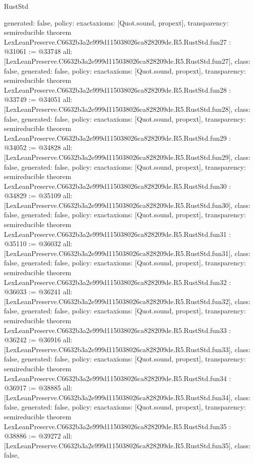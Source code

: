\begin{lexlean}{RustStd}
\begin{coremodule}
{  generated: false,
  policy: exact{axioms: [Quot.sound, propext]},
  transparency: semireducible
}
theorem LexLeanPreserve.C6632b3a2e999d115038026ca828209de.R5.RustStd.fun27 : @31061 := @33748 {
  all: [LexLeanPreserve.C6632b3a2e999d115038026ca828209de.R5.RustStd.fun27],
  class: false,
  generated: false,
  policy: exact{axioms: [Quot.sound, propext]},
  transparency: semireducible
}
theorem LexLeanPreserve.C6632b3a2e999d115038026ca828209de.R5.RustStd.fun28 : @33749 := @34051 {
  all: [LexLeanPreserve.C6632b3a2e999d115038026ca828209de.R5.RustStd.fun28],
  class: false,
  generated: false,
  policy: exact{axioms: [Quot.sound, propext]},
  transparency: semireducible
}
theorem LexLeanPreserve.C6632b3a2e999d115038026ca828209de.R5.RustStd.fun29 : @34052 := @34828 {
  all: [LexLeanPreserve.C6632b3a2e999d115038026ca828209de.R5.RustStd.fun29],
  class: false,
  generated: false,
  policy: exact{axioms: [Quot.sound, propext]},
  transparency: semireducible
}
theorem LexLeanPreserve.C6632b3a2e999d115038026ca828209de.R5.RustStd.fun30 : @34829 := @35109 {
  all: [LexLeanPreserve.C6632b3a2e999d115038026ca828209de.R5.RustStd.fun30],
  class: false,
  generated: false,
  policy: exact{axioms: [Quot.sound, propext]},
  transparency: semireducible
}
theorem LexLeanPreserve.C6632b3a2e999d115038026ca828209de.R5.RustStd.fun31 : @35110 := @36032 {
  all: [LexLeanPreserve.C6632b3a2e999d115038026ca828209de.R5.RustStd.fun31],
  class: false,
  generated: false,
  policy: exact{axioms: [Quot.sound, propext]},
  transparency: semireducible
}
theorem LexLeanPreserve.C6632b3a2e999d115038026ca828209de.R5.RustStd.fun32 : @36033 := @36241 {
  all: [LexLeanPreserve.C6632b3a2e999d115038026ca828209de.R5.RustStd.fun32],
  class: false,
  generated: false,
  policy: exact{axioms: [Quot.sound, propext]},
  transparency: semireducible
}
theorem LexLeanPreserve.C6632b3a2e999d115038026ca828209de.R5.RustStd.fun33 : @36242 := @36916 {
  all: [LexLeanPreserve.C6632b3a2e999d115038026ca828209de.R5.RustStd.fun33],
  class: false,
  generated: false,
  policy: exact{axioms: [Quot.sound, propext]},
  transparency: semireducible
}
theorem LexLeanPreserve.C6632b3a2e999d115038026ca828209de.R5.RustStd.fun34 : @36917 := @38885 {
  all: [LexLeanPreserve.C6632b3a2e999d115038026ca828209de.R5.RustStd.fun34],
  class: false,
  generated: false,
  policy: exact{axioms: [Quot.sound, propext]},
  transparency: semireducible
}
theorem LexLeanPreserve.C6632b3a2e999d115038026ca828209de.R5.RustStd.fun35 : @38886 := @39272 {
  all: [LexLeanPreserve.C6632b3a2e999d115038026ca828209de.R5.RustStd.fun35],
  class: false,
}
\end{coremodule}
\end{lexlean}
